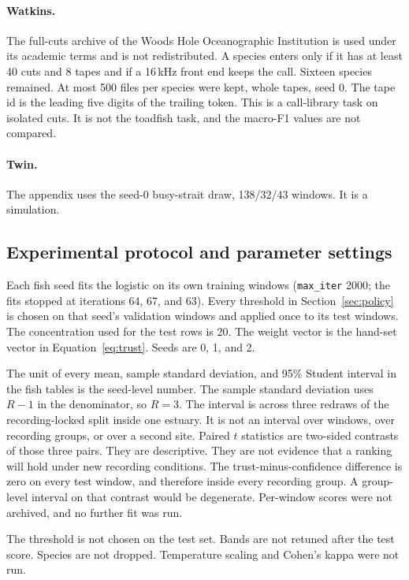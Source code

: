 \documentclass[sn-mathphys-num]{sn-jnl}%
\theoremstyle{thmstyleone}%
\theoremstyle{thmstyletwo}%
\theoremstyle{thmstylethree}%
\begin{document}
\paragraph{Watkins.}
The full-cuts archive of the Woods Hole Oceanographic Institution \cite{sayigh2016} is used under its academic terms and is not redistributed. A species enters only if it has at least 40 cuts and 8 tapes and if a 16\,kHz front end keeps the call. Sixteen species remained. At most 500 files per species were kept, whole tapes, seed 0. The tape id is the leading five digits of the trailing token. This is a call-library task on isolated cuts. It is not the toadfish task, and the macro-F1 values are not compared.

\paragraph{Twin.}
The appendix uses the seed-0 busy-strait draw, 138/32/43 windows. It is a simulation.

\subsection{Experimental protocol and parameter settings}\label{sec:protocol}

Each fish seed fits the logistic on its own training windows (\texttt{max\_iter} 2000; the fits stopped at iterations 64, 67, and 63). Every threshold in Section~\ref{sec:policy} is chosen on that seed's validation windows and applied once to its test windows. The concentration used for the test rows is 20. The weight vector is the hand-set vector in Equation~\eqref{eq:trust}. Seeds are 0, 1, and 2.

The unit of every mean, sample standard deviation, and 95\% Student interval in the fish tables is the seed-level number. The sample standard deviation uses $R-1$ in the denominator, so $R = 3$. The interval is across three redraws of the recording-locked split inside one estuary. It is not an interval over windows, over recording groups, or over a second site. Paired $t$ statistics are two-sided contrasts of those three pairs. They are descriptive. They are not evidence that a ranking will hold under new recording conditions. The trust-minus-confidence difference is zero on every test window, and therefore inside every recording group. A group-level interval on that contrast would be degenerate. Per-window scores were not archived, and no further fit was run.

The threshold is not chosen on the test set. Bands are not retuned after the test score. Species are not dropped. Temperature scaling and Cohen's kappa were not run.
\end{document}
